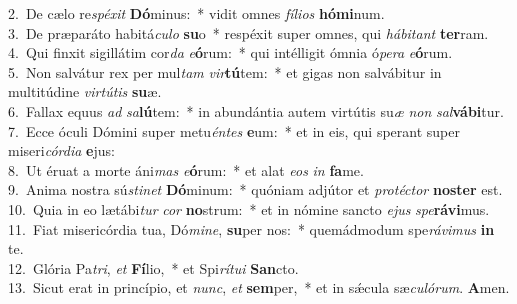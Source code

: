 {2.~}De cælo re\textit{spé}\textit{xit} \textbf{Dó}minus:~* vidit omnes \textit{fí}\textit{li}\textit{os} \textbf{hó}\textbf{mi}num.\\
{3.~}De præparáto habitá\textit{cu}\textit{lo} \textbf{su}o~* respéxit super omnes, qui \textit{há}\textit{bi}\textit{tant} \textbf{ter}ram.\\
{4.~}Qui finxit sigillátim cor\textit{da} \textit{e}\textbf{ó}rum:~* qui intélligit ómnia ó\textit{pe}\textit{ra} \textit{e}\textbf{ó}rum.\\
{5.~}Non salvátur rex per mul\textit{tam} \textit{vir}\textbf{tú}tem:~* et gigas non salvábitur in multitúdine \textit{vir}\textit{tú}\textit{tis} \textbf{su}æ.\\
{6.~}Fallax equus \textit{ad} \textit{sa}\textbf{lú}tem:~* in abundántia autem virtútis su\textit{æ} \textit{non} \textit{sal}\textbf{vá}\textbf{bi}tur.\\
{7.~}Ecce óculi Dómini super metu\textit{én}\textit{tes} \textbf{e}um:~* et in eis, qui sperant super miseri\textit{cór}\textit{di}\textit{a} \textbf{e}jus:\\
{8.~}Ut éruat a morte áni\textit{mas} \textit{e}\textbf{ó}rum:~* et alat \textit{e}\textit{os} \textit{in} \textbf{fa}me.\\
{9.~}Anima nostra sú\textit{sti}\textit{net} \textbf{Dó}minum:~* quóniam adjútor et \textit{pro}\textit{té}\textit{ctor} \textbf{no}\textbf{ster} est.\\
{10.~}Quia in eo lætábi\textit{tur} \textit{cor} \textbf{no}strum:~* et in nómine sancto \textit{e}\textit{jus} \textit{spe}\textbf{rá}\textbf{vi}mus.\\
{11.~}Fiat misericórdia tua, Dó\textit{mi}\textit{ne}, \textbf{su}per nos:~* quemádmodum spe\textit{rá}\textit{vi}\textit{mus} \textbf{in} te.\\
{12.~}Glória Pa\textit{tri}, \textit{et} \textbf{Fí}lio,~* et Spi\textit{rí}\textit{tu}\textit{i} \textbf{San}cto.\\
{13.~}Sicut erat in princípio, et \textit{nunc}, \textit{et} \textbf{sem}per,~* et in sǽcula sæ\textit{cu}\textit{ló}\textit{rum}. \textbf{A}men.\\
